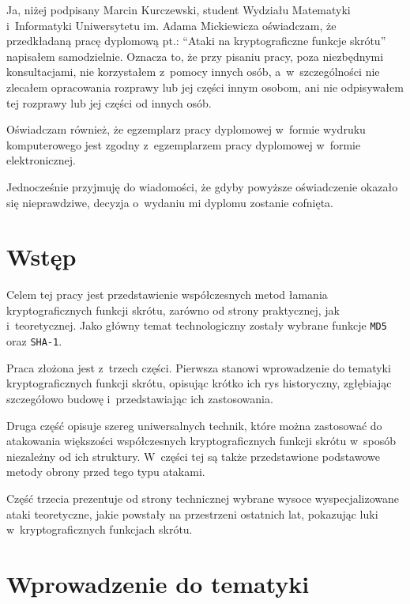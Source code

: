 \documentclass[12pt,a4paper,twoside]{article}
\begin{document}
Ja, niżej podpisany Marcin Kurczewski, student Wydziału Matematyki
i~Informatyki Uniwersytetu im. Adama Mickiewicza oświadczam, że przedkładaną
pracę dyplomową pt.: ``Ataki na kryptograficzne funkcje skrótu'' napisałem
samodzielnie. Oznacza to, że przy pisaniu pracy, poza niezbędnymi
konsultacjami, nie korzystałem z~pomocy innych osób, a~w~szczególności nie
zlecałem opracowania rozprawy lub jej części innym osobom, ani nie odpisywałem
tej rozprawy lub jej części od innych osób.

Oświadczam również, że egzemplarz pracy dyplomowej w~formie wydruku
komputerowego jest zgodny z~egzemplarzem pracy dyplomowej w~formie
elektronicznej.

Jednocześnie przyjmuję do wiadomości, że gdyby powyższe oświadczenie okazało
się nieprawdziwe, decyzja o~wydaniu mi dyplomu zostanie cofnięta.


\newpage
\setcounter{tocdepth}{3}
\tableofcontents

\newpage
\pagestyle{fancy}


\section{Wstęp}
Celem tej pracy jest przedstawienie współczesnych metod łamania
kryptograficznych funkcji skrótu, zarówno od strony praktycznej, jak
i~teoretycznej. Jako główny temat technologiczny zostały wybrane funkcje
\texttt{MD5} oraz \texttt{SHA-1}.

Praca złożona jest z~trzech części. Pierwsza stanowi wprowadzenie do tematyki
kryptograficznych funkcji skrótu, opisując krótko ich rys historyczny,
zgłębiając szczegółowo budowę i~przedstawiając ich zastosowania.

Druga część opisuje szereg uniwersalnych technik, które można zastosować do
atakowania większości współczesnych kryptograficznych funkcji skrótu w~sposób
niezależny od ich struktury. W~części tej są także przedstawione podstawowe
metody obrony przed tego typu atakami.

Część trzecia prezentuje od strony technicznej wybrane wysoce wyspecjalizowane
ataki teoretyczne, jakie powstały na przestrzeni ostatnich lat, pokazując luki
w~kryptograficznych funkcjach skrótu.

\newpage



\section{Wprowadzenie do tematyki}
\end{document}
